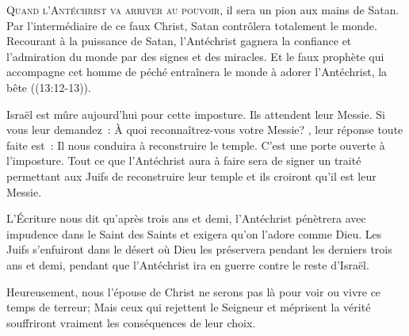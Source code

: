


\lettrine{Q}{uand l'Antéchrist va arriver au pouvoir,} 
 il sera un pion aux mains de Satan. Par l'intermédiaire de ce faux Christ,
 Satan contrôlera totalement le monde. Recourant à la puissance de Satan,
 l'Antéchrist gagnera la confiance et l'admiration du monde
 par des signes et des miracles.
 Et le faux prophète qui accompagne cet homme de péché entraînera le monde
 à adorer l'Antéchrist, la \og bête \fg{} ((13:12-13)). 



Israël est mûre aujourd'hui pour cette imposture. Ils attendent leur Messie.
 Si vous leur demandez~: 
 \og À quoi reconnaîtrez-vous votre Messie? \fg{},
 leur réponse toute faite est~: 
 \og Il nous conduira à reconstruire le temple. \fg{}
 C'est une porte ouverte à l'imposture. Tout ce que l'Antéchrist
 aura à faire sera de signer un traité permettant aux Juifs
 de reconstruire leur temple \ocadr et ils croiront qu'il est leur Messie. 

L'Écriture nous dit qu'après trois ans et demi,
 l'Antéchrist pénètrera avec impudence dans le Saint des Saints
 et exigera qu'on l'adore comme Dieu. Les Juifs s'enfuiront dans le désert
 où Dieu les préservera pendant les derniers trois ans et demi,
 pendant que l'Antéchrist ira en guerre contre le reste d'Israël. 

Heureusement, nous \ocadr l'épouse de Christ \fcadr{} ne serons pas là
 pour voir ou vivre ce temps de terreur; Mais ceux qui rejettent le Seigneur
 et méprisent 
 la vérité souffriront vraiment les conséquences 
 de leur choix. 

\dvrule




